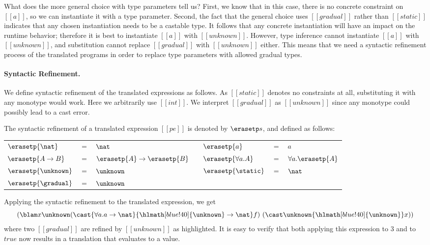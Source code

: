 What does the more general choice with type parameters tell us? First, we know that in this case, there is no concrete
constraint on $[[a]]$, so we can instantiate it with a type parameter. Second,
the fact that the general choice uses $[[gradual]]$ rather than
$[[static]]$ indicates that any chosen instantiation needs to be a castable type.
It follows that any concrete instantiation will have an impact on the
runtime behavior; therefore it is best to instantiate $[[a]]$ with
$[[unknown]]$. However, type inference cannot instantiate $[[a]]$ with
$[[unknown]]$, and substitution cannot replace $[[gradual]]$ with $[[unknown]]$ either.
This means that we need a syntactic refinement process of the translated programs in
order to replace type parameters with allowed gradual types.

\paragraph{Syntactic Refinement.}

We define syntactic refinement of the translated expressions as follows. As
$[[static]]$ denotes no constraints at all, substituting it with any monotype
would work. Here we arbitrarily use $[[int]]$. We interpret
$[[gradual]]$ as $[[unknown]]$ since any monotype could possibly lead to a cast
error.

\begin{definition} The syntactic refinement of a
  translated expression $[[pe]]$ is denoted by $\erasetp s$, and defined as follows:
  \begin{center}
\begin{tabular}{lllllll} \toprule
  $\erasetp{\nat}$ &$=$ & $ \nat$ &  &   $\erasetp{a} $ & $ = $ & $a $ \\
  $\erasetp{A \to B}$ &$=$ & $ \erasetp{A} \to \erasetp{B}$ &  &   $\erasetp {\forall a. A} $ & $ = $ & $ \forall a . \erasetp{A} $ \\
  $\erasetp{\unknown}$ &$=$ & $\unknown$ &  &   $\erasetp {\static} $ & $ = $ & $\nat$ \\
  $\erasetp{\gradual}$ &$=$ & $\unknown$ &  \\ \bottomrule
\end{tabular}

  \end{center}
\end{definition}
\noindent Applying the syntactic refinement to the translated
expression, we get
  \[
    (\blam x \unknown (\cast {\forall a. a \to \nat} { \hlmath[blue!40]{\unknown} \to \nat} f) ~
    (\cast \unknown {\hlmath[blue!40]{\unknown}} x))
  \]
where two $[[gradual]]$ are refined by $[[unknown]]$ as highlighted.
It is easy to verify that both applying this expression to $3$ and to
$\mathit{true}$ now results in a translation that evaluates to
a value.

